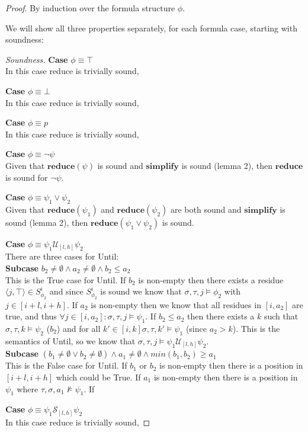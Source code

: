 \documentclass[10pt,a4paper]{article}
\newcommand{\rp}[2]{\ensuremath{\langle #1, #2 \rangle}}
\begin{document}
\noindent \emph{Proof}. By induction over the formula structure $\phi$.

We will show all three properties separately, for each formula case, starting with soundness:

\begin{proof}[Soundness]

\noindent \textbf{Case} $\phi \equiv \top$ \\
In this case reduce is trivially sound, 

\noindent \textbf{Case} $\phi \equiv \bot$ \\
In this case reduce is trivially sound, 

\noindent \textbf{Case} $\phi \equiv p$ \\
In this case reduce is trivially sound, 

\noindent \textbf{Case} $\phi \equiv \neg \psi$ \\
Given that $\mathbf{reduce}(\psi)$ is sound and $\mathbf{simplify}$ is sound (lemma 2), then $\mathbf{reduce}$ is sound for $\neg \psi$.

\noindent \textbf{Case} $\phi \equiv \psi_1 \vee \psi_2$ \\
Given that $\mathbf{reduce}(\psi_1)$ and $\mathbf{reduce}(\psi_2)$ are both sound and $\mathbf{simplify}$ is sound (lemma 2), then $\mathbf{reduce}(\psi_1 \vee \psi_2)$ is sound.

\noindent \textbf{Case} $\phi \equiv \psi_1 \mathcal{U}_{[l,h]} \psi_2$ \\
There are three cases for Until: \\
\textbf{Subcase} $b_2 \neq \emptyset \wedge a_2 \neq \emptyset \wedge b_2 \leq a_2$ \\
This is the True case for Until. If $b_2$ is non-empty then there exists a residue $\rp{j}{\top} \in S^i_{\phi_2}$ and since $S^i_{\phi_2}$ is sound we know that $\sigma, \tau, j \vDash \phi_2$ with $j \in [i+l,i+h]$. If $a_2$ is non-empty then we know that all residues in $[i,a_2]$ are true, and thus $\forall j \in [i,a_2]: \sigma, \tau, j \vDash \psi_1$. If $b_2 \leq a_2$ then there exists a $k$ such that $\sigma, \tau, k \vDash \psi_2$ ($b_2$) and for all $k' \in [i,k] \sigma, \tau, k' \vDash \psi_1$ (since $a_2 > k$). This is the semantics of Until, so we know that $\sigma, \tau, j \vDash \psi_1 \mathcal{U}_{[l,h]} \psi_2$. \\
\textbf{Subcase} $(b_1 \neq \emptyset \vee b_2 \neq \emptyset) \wedge a_1 \neq \emptyset \wedge min(b_1,b_2) \geq a_1$ \\
This is the False case for Until. If $b_1$ or $b_2$ is non-empty then there is a position in $[i+l,i+h]$ which could be True. If $a_1$ is non-empty then there is a position in $\psi_1$ where $\tau, \sigma, a_1 \nvDash \psi_1$. If 


\noindent \textbf{Case} $\phi \equiv \psi_1 \mathcal{S}_{[l,h]} \psi_2$ \\
In this case reduce is trivially sound, 
\end{proof}
\end{document}
